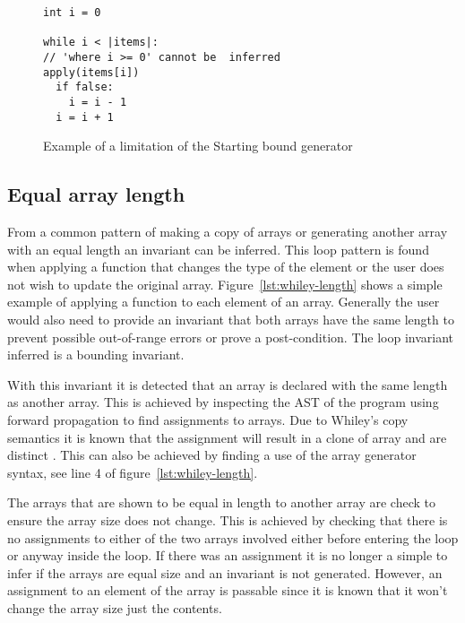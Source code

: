 \begin{figure}[ht]
\begin{lstlisting}
int i = 0

while i < |items|:
// 'where i >= 0' cannot be  inferred
apply(items[i])
  if false:
    i = i - 1
  i = i + 1
\end{lstlisting}
\caption{Example of a limitation of the Starting bound generator}
\label{lst:whiley-start-limit}
\end{figure}

\subsection{Equal array length}


From a common pattern of making a copy of arrays or generating another array
with an equal length an invariant can be inferred.
This loop pattern is found when applying a function that changes the type of
the element or the user does not wish to update the original array.
Figure~\ref{lst:whiley-length} shows a simple example of applying a function
 to each element of an array.
Generally the user would also need to provide an invariant that both arrays
have the same length to prevent possible out-of-range errors or prove a
post-condition.
The loop invariant inferred is a bounding invariant.



With this invariant it is detected that an array is declared with the same
length as another array.
This is achieved by inspecting the AST of the program
using forward propagation to find assignments to arrays.
Due to Whiley's copy semantics it is known that the assignment will result
in a clone of array and are distinct \cite{whiley-origin} \cite{whiley-arrays}.
This can also be achieved by finding a use of the array
generator syntax, see line 4 of figure~\ref{lst:whiley-length}.

The arrays that are shown to be equal in length to another array are
check to ensure the array size does not change.
This is achieved by checking that there is no assignments to either
of the two arrays involved either before entering the loop or
anyway inside the loop.
If there was an assignment it is no longer a simple to infer if
the arrays are equal size and an invariant is not generated.
However, an assignment to an element of the array is passable since it
is known that it won't change the array size just the contents.


